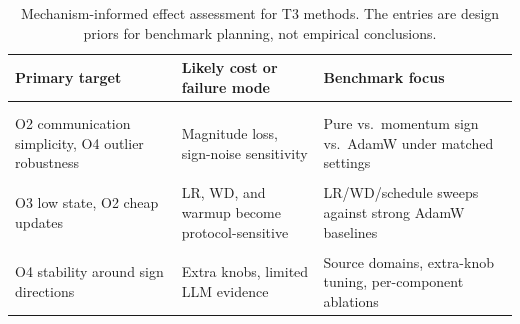 \begin{table}[!htbp]
  \centering
  \caption{Mechanism-informed effect assessment for T3 methods. The entries
  are design priors for benchmark planning, not empirical conclusions.}
  \label{tab:t3_effect_assessment}
  \scriptsize
  \setlength{\tabcolsep}{3pt}
  \renewcommand{\arraystretch}{1.08}
  \begin{tabularx}{\linewidth}{@{}Y Y Y@{}}
    \toprule
    Primary target & Likely cost or failure mode & Benchmark focus \\
    \midrule
     \\
     \\
      O2 communication simplicity, O4 outlier robustness
      & Magnitude loss, sign-noise sensitivity
      & Pure vs.\ momentum sign vs.\ AdamW under matched settings \\
     \\
      O3 low state, O2 cheap updates
      & LR, WD, and warmup become protocol-sensitive
      & LR/WD/schedule sweeps against strong AdamW baselines \\
     \\
      O4 stability around sign directions
      & Extra knobs, limited LLM evidence
      & Source domains, extra-knob tuning, per-component ablations \\
    \bottomrule
  \end{tabularx}
\end{table}
